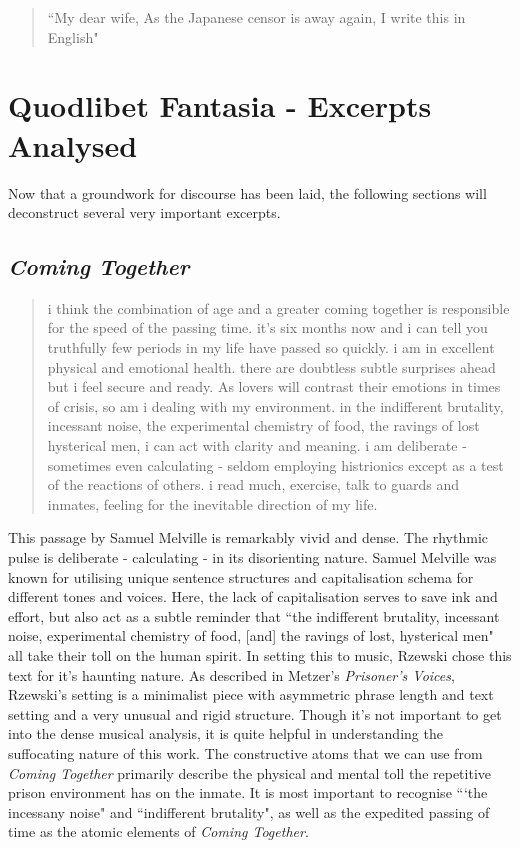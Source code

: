 \documentclass[14pt, letterpaper]{report}
\begin{document}
    \begin{quote}   
    		``My dear wife, As the Japanese censor is away again, I write this in 
    		English"\autocite[121]{life-of-paper}
    \end{quote}
	
	\section*{Quodlibet Fantasia - Excerpts Analysed}
	Now that a groundwork for discourse has been laid, the following sections 
	will deconstruct several very important excerpts.
	
	\subsection*{\textit{Coming Together}}
	\begin{quote} i think the combination of age and a greater coming 
	together is responsible for the speed of the passing time. it’s 
	six months now and i can tell you truthfully few periods in my life 
	have passed so quickly. i am in excellent physical and emotional health. 
	there are doubtless subtle surprises ahead but i feel secure and ready. 
	As lovers will contrast their emotions in times of crisis, so am i dealing 
	with my environment. in the indifferent brutality, incessant noise, the 
	experimental chemistry of food, the ravings of lost hysterical men, i 
	can act with clarity and meaning. i am deliberate - sometimes even 
	calculating - seldom employing histrionics except as a test of the 
	reactions of others. i read much, exercise, talk to guards and inmates, 
	feeling for the inevitable direction of my life.\autocite{coming-together}
	
	\end{quote}
	
	This passage by Samuel Melville is remarkably vivid and dense. The rhythmic
	pulse is deliberate - calculating - in its disorienting nature. Samuel Melville 
	was known for utilising unique sentence structures and capitalisation schema 
	for different tones and voices. Here, the lack of capitalisation serves to 
	save ink and effort, but also act as a subtle reminder that ``the indifferent 
	brutality, incessant noise, experimental chemistry of food, [and] the 
	ravings of lost, hysterical men" all take their toll on the human spirit. In 
	setting this to music, Rzewski chose this text for it's haunting nature. As 
	described in Metzer's \textit{Prisoner's Voices}, Rzewski's setting is a 
	minimalist piece with asymmetric phrase length and text setting and a 
	very unusual and rigid structure. Though it's not important to 
	get into the dense musical analysis, it is quite helpful in understanding the 
	suffocating nature of this work. The constructive atoms that we can use from 
	\textit{Coming Together} primarily describe the physical and mental toll the 
	repetitive prison environment has on the inmate. It is most important to 
	recognise ```the incessany noise" and ``indifferent brutality", as well as the 
	expedited passing of time as the atomic elements of \textit{Coming Together}.
	
\end{document}
